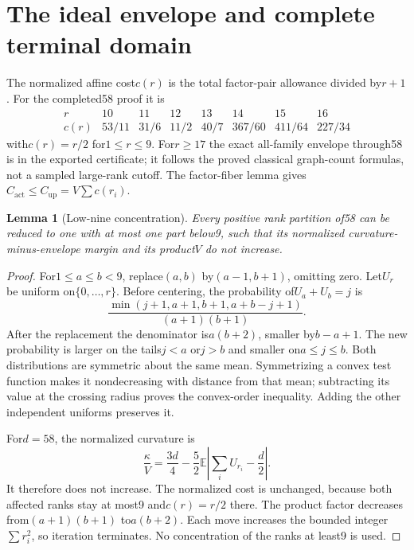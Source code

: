 \documentclass[11pt]{article}
\newtheorem{lemma}[theorem]{Lemma}
\theoremstyle{remark}\newtheorem{remark}[theorem]{Remark}
\newcommand{\actual}{\mathrm{act}}
\newcommand{\upper}{\mathrm{up}}
\begin{document}
\section{The ideal envelope and complete terminal domain}

The normalized affine cost$c(r)$ is the total factor-pair allowance
divided by$r+1$. For the completed58 proof it is
\[
\begin{array}{c|rrrrrrr}
r&10&11&12&13&14&15&16\\\hline
c(r)&53/11&31/6&11/2&40/7&367/60&411/64&227/34
\end{array}
\]
with$c(r)=r/2$ for$1\leq r\leq9$. For$r\geq17$ the exact all-family
envelope through58 is in the exported certificate; it follows the
proved classical graph-count formulas, not a sampled large-rank cutoff.
The factor-fiber lemma gives $C_{\actual}\leq C_{\upper}=V\sum c(r_i)$.

\begin{lemma}[Low-nine concentration]\label{lem:concentration}
Every positive rank partition of58 can be reduced to one with at most
one part below9, such that its normalized curvature-minus-envelope
margin and its product$V$ do not increase.
\end{lemma}
\begin{proof}
For$1\leq a\leq b<9$, replace$(a,b)$ by$(a-1,b+1)$, omitting zero.
Let$U_r$ be uniform on$\{0,\ldots,r\}$. Before centering, the probability
of$U_a+U_b=j$ is
\[
 \frac{\min(j+1,a+1,b+1,a+b-j+1)}{(a+1)(b+1)}.
\]
After the replacement the denominator is$a(b+2)$, smaller by$b-a+1$.
The new probability is larger on the tails$j<a$ or$j>b$ and smaller
on$a\leq j\leq b$. Both distributions are symmetric about the same
mean. Symmetrizing a convex test function makes it nondecreasing with
distance from that mean; subtracting its value at the crossing radius
proves the convex-order inequality. Adding the other independent
uniforms preserves it.

For$d=58$, the normalized curvature is
\[
 \frac{\kappa}{V}=\frac{3d}{4}
   -\frac52\mathbb E\left|\sum_iU_{r_i}-\frac d2\right|.
\]
It therefore does not increase. The normalized cost is unchanged,
because both affected ranks stay at most9 and$c(r)=r/2$ there.
The product factor decreases from$(a+1)(b+1)$ to$a(b+2)$.
Each move increases the bounded integer$\sum r_i^2$, so iteration
terminates. No concentration of the ranks at least9 is used.
\end{proof}
\end{document}
